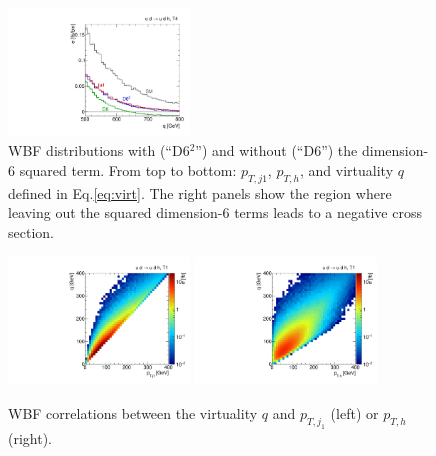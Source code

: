 \begin{figure}
  \hspace*{0.05\textwidth}
  \includegraphics[width=0.43\textwidth]{fig/validity/WBF_T4_q.pdf}
  \caption{WBF distributions with (``D6$^{2}$'') and without (``D6'') the
    dimension-6 squared term. From top to bottom: $p_{T,j1}$, $p_{T,h}$, and
    virtuality $q$ defined in Eq.\;\eqref{eq:virt}. The right panels show the region where
    leaving out the squared dimension-6 terms leads to a negative cross
    section.}
  \label{fig:validity_squared_WBF}
\end{figure}


\begin{figure}[t]
  \includegraphics[width=0.43\textwidth]{fig/validity/WBF_correl_q_j1pt.pdf}
  \hspace*{0.05\textwidth}
  \includegraphics[width=0.43\textwidth]{fig/validity/WBF_correl_q_Hpt.pdf} 
  \caption{WBF correlations between the virtuality $q$ and
    $p_{T,j_1}$ (left) or $p_{T,h}$ (right).}
  \label{fig:validity_virt_corr}
\end{figure}

